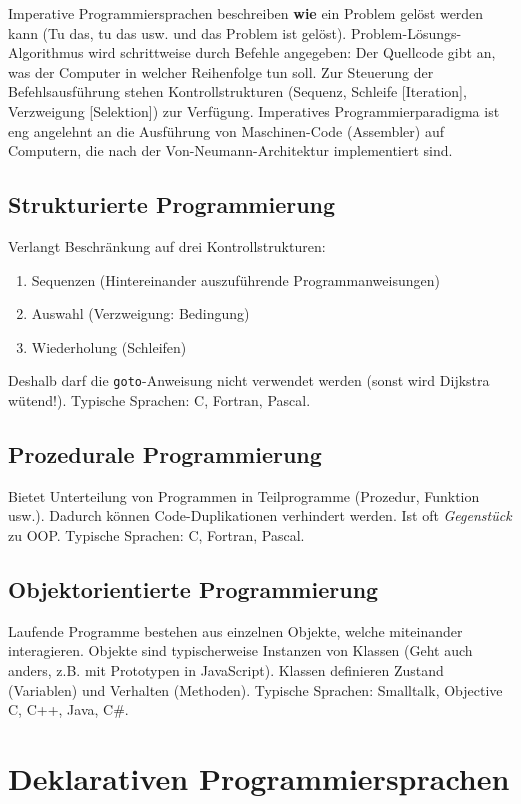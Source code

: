 Imperative Programmiersprachen beschreiben \textbf{wie} ein Problem gelöst werden kann (Tu das, tu das usw. und das Problem ist gelöst). Problem-Lösungs-Algorithmus wird schrittweise durch Befehle angegeben: Der Quellcode gibt an, was der Computer in welcher Reihenfolge tun soll. Zur Steuerung der Befehlsausführung stehen Kontrollstrukturen (Sequenz, Schleife [Iteration], Verzweigung [Selektion]) zur Verfügung. Imperatives Programmierparadigma ist eng angelehnt an die Ausführung von Maschinen-Code (Assembler) auf Computern, die nach der Von-Neumann-Architektur implementiert sind.

\subsection{Strukturierte Programmierung}

Verlangt Beschränkung auf drei Kontrollstrukturen:
\begin{enumerate}
	\item Sequenzen (Hintereinander auszuführende Programmanweisungen)
	\item Auswahl (Verzweigung: Bedingung)
	\item Wiederholung (Schleifen)
\end{enumerate}
Deshalb darf die \texttt{goto}-Anweisung nicht verwendet werden (sonst wird Dijkstra wütend!). Typische Sprachen: C, Fortran, Pascal.

\subsection{Prozedurale Programmierung}

Bietet Unterteilung von Programmen in Teilprogramme (Prozedur, Funktion usw.). Dadurch können Code-Duplikationen verhindert werden. Ist oft \textit{Gegenstück} zu OOP. Typische Sprachen: C, Fortran, Pascal.

\subsection{Objektorientierte Programmierung}

Laufende Programme bestehen aus einzelnen Objekte, welche miteinander interagieren. Objekte sind typischerweise Instanzen von Klassen (Geht auch anders, z.B. mit Prototypen in JavaScript). Klassen definieren Zustand (Variablen) und Verhalten (Methoden). Typische Sprachen: Smalltalk, Objective C, C++, Java, C\#.

\section{Deklarativen Programmiersprachen}

